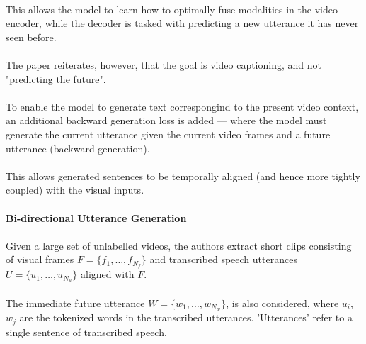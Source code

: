 \documentclass{article}
\begin{document}
\paragraph{}This allows the model to learn how to optimally fuse modalities in the video encoder,
while the decoder is tasked with predicting a new utterance it has never seen before.

\paragraph{}The paper reiterates, however, that the goal is video captioning, and not "predicting
the future".

\paragraph{}To enable the model to generate text correspongind to the present video context, an
additional backward generation loss is added --- where the model must generate the current utterance given the 
current video frames and a future utterance (backward generation).

\paragraph{}This allows generated sentences to be temporally aligned (and hence more tightly coupled) with 
the visual inputs.

\paragraph{Bi-directional Utterance Generation}

\paragraph{}Given a large set of unlabelled videos, the authors extract short clips
consisting of visual frames $F = \{f_1 ,\ldots, f_{N_f}\}$ and transcribed speech utterances
$U = \{u_1, \ldots, u_{N_u}\}$ aligned with $F$.

\paragraph{}The immediate future utterance $W = \{w_1, \ldots, w_{N_w}\}$, is also considered,
where $u_i$, $w_j$ are the tokenized words in the transcribed utterances. 'Utterances' refer
to a single sentence of transcribed speech.
\end{document}
